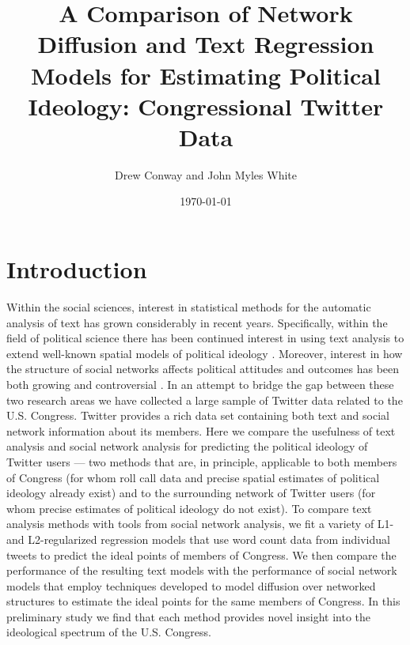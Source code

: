 \documentclass[10pt]{article}
\title{A Comparison of Network Diffusion and Text Regression Models for Estimating Political Ideology: Congressional Twitter Data}
\author{Drew Conway and John Myles White}
\date{\today}
\begin{document}
\maketitle

\section{Introduction}
Within the social sciences, interest in statistical methods for the automatic analysis of text has grown considerably in recent years.  Specifically, within the field of political science there has been continued interest in using text analysis to extend well-known spatial models of political ideology \citep{Grimmer_2011, Monroe_2008, Laver_2003}.  Moreover, interest in how the structure of social networks affects political attitudes and outcomes has been both growing \citep{Siegel_2009, Burton_2009} and controversial \citep{Fowler_2010, Lyons_2010}.  In an attempt to bridge the gap between these two research areas we have collected a large sample of Twitter data related to the U.S. Congress. Twitter provides a rich data set containing both text and social network information about its members. Here we compare the usefulness of text analysis and social network analysis for predicting the political ideology of Twitter users --- two methods that are, in principle, applicable to both members of Congress (for whom roll call data and precise spatial estimates of political ideology already exist) and to the surrounding network of Twitter users (for whom precise estimates of political ideology do not exist). To compare text analysis methods with tools from social network analysis, we fit a variety of L1- and L2-regularized regression models that use word count data from individual tweets to predict the ideal points of members of Congress. We then compare the performance of the resulting text models with the performance of social network models that employ techniques developed to model diffusion over networked structures to estimate the ideal points for the same members of Congress. In this preliminary study we find that each method provides novel insight into the ideological spectrum of the U.S. Congress.
\end{document}
